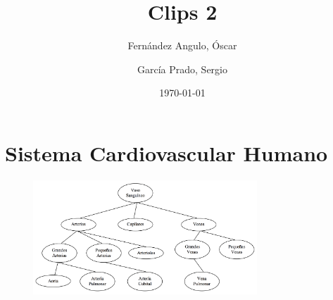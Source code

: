 \documentclass[10pt, a4paper,spanish]{article}
\title{\vspace{-15mm}\fontsize{24pt}{10pt}\selectfont\textbf{Clips 2}} %
\author{
	Fernández Angulo, Óscar \\
	\and
	García Prado, Sergio
}
\date{\today}
\begin{document}
	\maketitle %

	\thispagestyle{fancy} %



	\section{Sistema Cardiovascular Humano}

		\begin{figure}[H]
			\begin{center}
				\includegraphics[width=0.75\textwidth]{diagram}
			\end{center}
		\end{figure}
\end{document}
